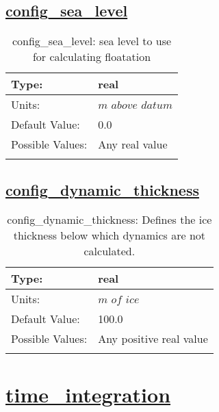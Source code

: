 \subsection[config\_sea\_level]{\hyperref[sec:nm_tab_li_model]{config\_sea\_level}}
\label{subsec:nm_sec_config_sea_level}
\begin{center}
\begin{longtable}{| p{2.0in} | p{4.0in} |}
    \hline
    Type: & real \\
    \hline
    Units: & $m$ $above$ $datum$ \\
    \hline
    Default Value: & 0.0 \\
    \hline
    Possible Values: & Any real value \\
    \hline
    \caption{config\_sea\_level: sea level to use for calculating floatation}
\end{longtable}
\end{center}
\subsection[config\_dynamic\_thickness]{\hyperref[sec:nm_tab_li_model]{config\_dynamic\_thickness}}
\label{subsec:nm_sec_config_dynamic_thickness}
\begin{center}
\begin{longtable}{| p{2.0in} | p{4.0in} |}
    \hline
    Type: & real \\
    \hline
    Units: & $m$ $of$ $ice$ \\
    \hline
    Default Value: & 100.0 \\
    \hline
    Possible Values: & Any positive real value \\
    \hline
    \caption{config\_dynamic\_thickness: Defines the ice thickness below which dynamics are not calculated.}
\end{longtable}
\end{center}
\section[time\_integration]{\hyperref[sec:nm_tab_time_integration]{time\_integration}}
\label{sec:nm_sec_time_integration}
